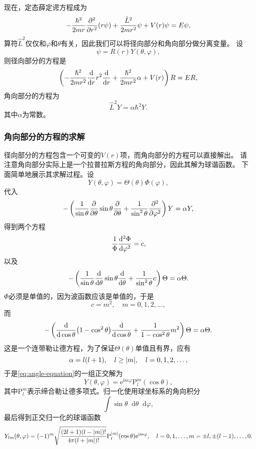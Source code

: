 \documentclass[UTF8, a4paper]{ctexart}
\newcommand*{\ee}{\mathrm{e}}
\newcommand*{\ii}{\mathrm{i}}
\renewcommand*{\dd}{\mathop{}\!\mathrm{d}}
\begin{document}
现在，定态薛定谔方程成为
\[
    - \frac{\hbar^2}{2 m r} \pdv[2]{r} (r \psi) + \frac{\hat{L}^2}{2 m r^2} \psi + V(r) \psi = E \psi,
\]
算符$\hat{L}^2$仅仅和$\varphi$和$\theta$有关，因此我们可以将径向部分和角向部分做分离变量。
设
\[
    \psi = R(r) Y(\theta, \varphi),
\]
则径向部分的方程是
\begin{equation}
    \left( - \frac{\hbar^2}{2m r^2} \dv{r} r^2 \dv{r} + \frac{\hbar^2}{2m r^2} \alpha + V(r) \right) R = E R,
    \label{eq:original-r-equation}
\end{equation}
角向部分的方程为
\begin{equation}
    \hat{L}^2 Y = \alpha \hbar^2 Y.
    \label{eq:angle-equation}
\end{equation}
其中$\alpha$为常数。

\subsubsection{角向部分的方程的求解}

径向部分的方程包含一个可变的$V(r)$项，而角向部分的方程可以直接解出。
请注意角向部分实际上是一个拉普拉斯方程的角向部分，因此其解为球谐函数。
下面简单地展示其求解过程。设
\[
    Y(\theta, \varphi) = \Theta(\theta) \Phi(\varphi),
\]
代入
\[
    - \left( \frac{1}{\sin \theta} \pdv{\theta} \sin \theta \pdv{\theta} + \frac{1}{\sin^2 \theta} \pdv[2]{\varphi} \right) Y = \alpha Y,
\]
得到两个方程
\[
    \frac{1}{\Phi} \dv[2]{\Phi}{\varphi} = c,
\]
以及
\[
    - \left( \frac{1}{\sin \theta} \dv{\theta} \sin \theta \dv{\theta} + \frac{1}{\sin^2 \theta} c \right) \Theta = \alpha \Theta.
\]
$\Phi$必须是单值的，因为波函数应该是单值的，于是
\[
    c = m^2, \quad m = 0, 1, 2, \ldots,
\]
而
\[
    - \left( \dv{\cos \theta} (1 - \cos^2 \theta) \dv{\cos \theta} + \frac{1}{1 - \cos^2 \theta} m^2 \right) \Theta = \alpha \Theta.
\]
这是一个连带勒让德方程，为了保证$\Theta(\theta)$单值且有界，应有
\[
    \alpha = l(l+1), \quad l \geq \abs{m}, \quad l = 0, 1, 2, \ldots,
\]
于是\eqref{eq:angle-equation}的一组正交解为
\[
    Y(\theta, \varphi) = \ee^{\ii m \varphi} \mathrm{P}_l^m(\cos \theta),
\]
其中$\mathrm{P}_l^m$表示缔合勒让德多项式。归一化使用球坐标系的角向积分
\[
    \int \sin \theta \dd{\theta} \dd{\varphi},
\]
最后得到正交归一化的球谐函数
\begin{equation}
    Y_{lm}(\theta, \varphi) = (-1)^m \sqrt{\frac{(2l+1)(l-\abs{m})!}{4\pi (l+\abs{m})!}} \mathrm{P}_l^\abs{m} (\cos \theta) \ee^{\ii m \varphi}, \quad l = 0, 1, \ldots, m = \pm l, \pm (l-1), \ldots, 0 .
\end{equation}
\end{document}
